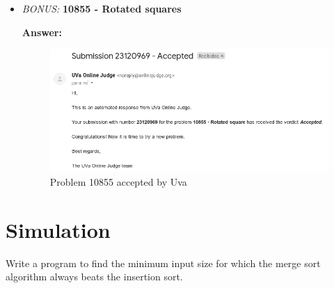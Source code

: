 \documentclass[12pt]{article}
\begin{document}
\begin{itemize}
    \item \emph{BONUS:} \textbf{10855 - Rotated squares}

    \textbf{Answer: }\\
    
    \begin{figure}[H]
        \centering
        \includegraphics[scale=0.5]{p2/ss/p2_10855.png}
        \caption{Problem 10855 accepted by Uva}
        \label{p2_10855}
    \end{figure}

\end{itemize}

\section{Simulation}

Write a program to find the minimum input size for which the merge sort algorithm always beats the insertion sort.
\end{document}
